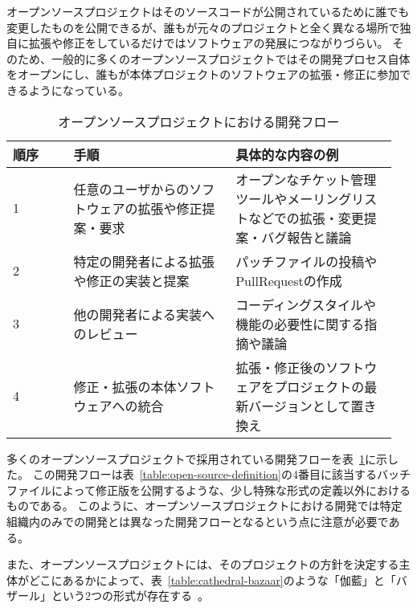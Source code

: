 オープンソースプロジェクトはそのソースコードが公開されているために誰でも変更したものを公開できるが、誰もが元々のプロジェクトと全く異なる場所で独自に拡張や修正をしているだけではソフトウェアの発展につながりづらい。
そのため、一般的に多くのオープンソースプロジェクトではその開発プロセス自体をオープンにし、誰もが本体プロジェクトのソフトウェアの拡張・修正に参加できるようになっている。

\begin{table}[!hbtp]
    \begin{center}
        \caption{オープンソースプロジェクトにおける開発フロー}
        \begin{tabular}{|p{0.15\linewidth}|p{0.4\linewidth}|p{0.4\linewidth}|}
            \hline
            順序 & 手順 & 具体的な内容の例 \\
            \hline
            \hline
            1 & 任意のユーザからのソフトウェアの拡張や修正提案・要求 & オープンなチケット管理ツールやメーリングリストなどでの拡張・変更提案・バグ報告と議論 \\
            \hline
            2 & 特定の開発者による拡張や修正の実装と提案 & パッチファイルの投稿やPullRequestの作成 \\
            \hline
            3 & 他の開発者による実装へのレビュー & コーディングスタイルや機能の必要性に関する指摘や議論 \\
            \hline
            4 & 修正・拡張の本体ソフトウェアへの統合 & 拡張・修正後のソフトウェアをプロジェクトの最新バージョンとして置き換え \\
            \hline
        \end{tabular}
        \label{table:open-source-flow}
    \end{center}
\end{table}

多くのオープンソースプロジェクトで採用されている開発フローを表~\ref{table:open-source-flow}に示した。
この開発フローは表~\ref{table:open-source-definition}の4番目に該当するバッチファイルによって修正版を公開するような、少し特殊な形式の定義以外におけるものである。
このように、オープンソースプロジェクトにおける開発では特定組織内のみでの開発とは異なった開発フローとなるという点に注意が必要である。

また、オープンソースプロジェクトには、そのプロジェクトの方針を決定する主体がどこにあるかによって、表~\ref{table:cathedral-bazaar}のような「伽藍」と「バザール」という2つの形式が存在する~\cite{raymond}。

